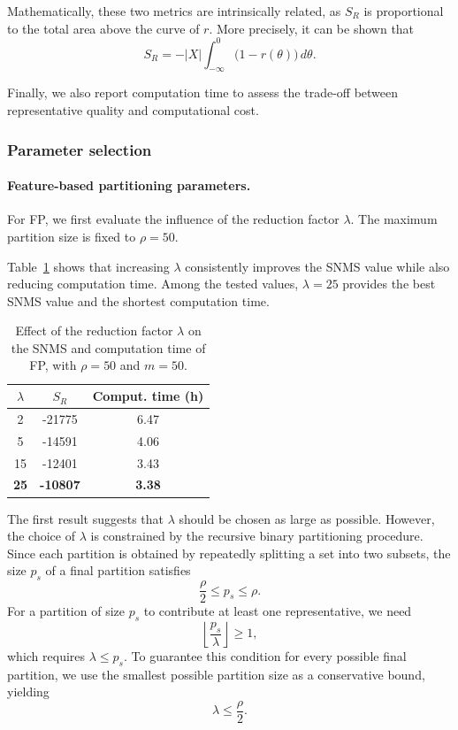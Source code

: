 \documentclass{ieeeaccess}
\newcommand{\representativeamount}{m}
\newcommand{\maxpartitionsize}{\rho}
\newcommand{\threshold}{\theta}
\newcommand{\reductionfactor}{\lambda}
\newcommand{\partitioning}{FP\xspace}
\begin{document}
Mathematically, these two metrics are intrinsically related, as
$S_R$ is proportional to the total area above the curve of $r$. More
precisely, it can be shown that
\[S_R = -|X| \int_{-\infty}^0 \big(1 - r(\threshold)\big) \, d\threshold.\]

Finally, we also report computation time to assess the trade-off between representative quality and computational cost.


\subsubsection{Parameter selection}

\paragraph*{Feature-based partitioning parameters.}

For \partitioning, we first evaluate the influence of the reduction factor $\reductionfactor$. The maximum partition size is fixed to $\maxpartitionsize=50$.

Table~\ref{tab:lambda} shows that increasing $\reductionfactor$ consistently improves the SNMS value while also reducing computation time. Among the tested values, $\reductionfactor=25$ provides the best SNMS value and the shortest computation time.
\begin{table}[htbp]
    \centering \normalsize
    \begin{tabular}{ |c|c|c| } 
     \hline
      $\reductionfactor$ & $S_R$ & {Comput. time (h)} \\
     \hline
     2  & -21775 & 6.47 \\ 
     5  & -14591 & 4.06 \\ 
     15 & -12401 & 3.43 \\ 
     \textbf{25} & \textbf{-10807} & \textbf{3.38} \\ 
     \hline
    \end{tabular}
\caption{\label{tab:lambda} Effect of the reduction factor $\reductionfactor$ on the SNMS and computation time of \partitioning, with $\maxpartitionsize=50$ and $\representativeamount=50$.}
\end{table}

The first result suggests that $\reductionfactor$ should be chosen as large as possible. However, the choice of $\reductionfactor$ is constrained by the recursive binary partitioning procedure. Since each partition is obtained by repeatedly splitting a set into two subsets, the size $p_s$ of a final partition satisfies
\[
\frac{\maxpartitionsize}{2} \leq p_s \leq \maxpartitionsize.
\]
For a partition of size $p_s$ to contribute at least one representative, we need
\[
\left\lfloor \frac{p_s}{\reductionfactor} \right\rfloor \geq 1,
\]
which requires $\reductionfactor \leq p_s$. To guarantee this condition for every possible final partition, we use the smallest possible partition size as a conservative bound, yielding
\[
\reductionfactor \leq \frac{\maxpartitionsize}{2}.
\]
\end{document}
